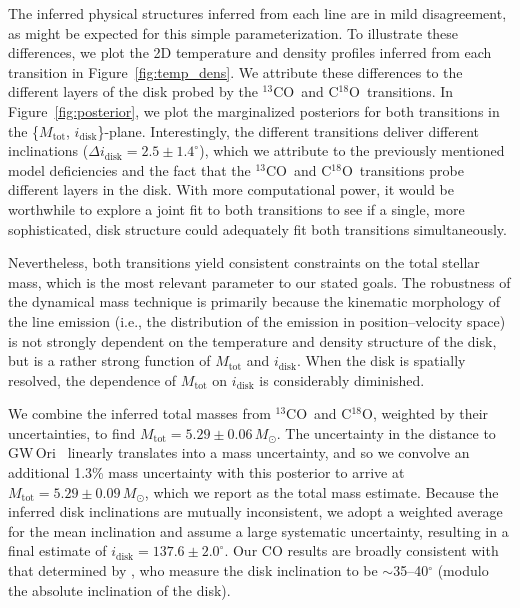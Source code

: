 \documentclass[twocolumn]{aastex61}
\newcommand{\obj}{GW\,Ori}
\newcommand{\thirteen}{${}^{13}$CO}
\newcommand{\eighteen}{C${}^{18}$O}
\begin{document}
The inferred physical structures inferred from each line are in mild disagreement, as might be expected for this simple parameterization. To illustrate these differences, we plot the 2D temperature and density profiles inferred from each transition in Figure~\ref{fig:temp_dens}. We attribute these differences to the different layers of the disk probed by the \thirteen\ and \eighteen\ transitions. In Figure~\ref{fig:posterior}, we plot the marginalized posteriors for both transitions in the \{$M_\mathrm{tot}$, $i_\mathrm{disk}$\}-plane. Interestingly, the different transitions deliver different inclinations ($\Delta i_\mathrm{disk} = 2.5 \pm 1.4^\circ$), which we attribute to the previously mentioned model deficiencies and the fact that the \thirteen\ and \eighteen\ transitions probe different layers in the disk. With more computational power, it would be worthwhile to explore a joint fit to both transitions to see if a single, more sophisticated, disk structure could adequately fit both transitions simultaneously.

Nevertheless, both transitions yield consistent constraints on the total stellar mass, which is the most relevant parameter to our stated goals. The robustness of the dynamical mass technique is primarily because the kinematic morphology of the line emission (i.e., the distribution of the emission in position--velocity space) is not strongly dependent on the temperature and density structure of the disk, but is a rather strong function of $M_\mathrm{tot}$ and $i_\mathrm{disk}$. When the disk is spatially resolved, the dependence of $M_\mathrm{tot}$ on $i_\mathrm{disk}$ is considerably diminished. 

We combine the inferred total masses from \thirteen\ and \eighteen, weighted by their uncertainties, to find $M_\mathrm{tot} = 5.29 \pm 0.06\,M_\odot$. The uncertainty in the distance to \obj\ \citep[$388 \pm 5\,$pc;][]{kounkel17} linearly translates into a mass uncertainty, and so we convolve an additional 1.3\% mass uncertainty with this posterior to arrive at $M_\mathrm{tot} = 5.29 \pm 0.09\,M_\odot$, which we report as the total mass estimate. Because the inferred disk inclinations are mutually inconsistent, we adopt a weighted average for the mean inclination and assume a large systematic uncertainty, resulting in a final estimate of $i_\mathrm{disk} = 137.6 \pm 2.0^\circ$. Our CO results are broadly consistent with that determined by \citet{fang17}, who measure the disk inclination to be $\sim$35--40$^\circ$ (modulo the absolute inclination of the disk).
\end{document}
